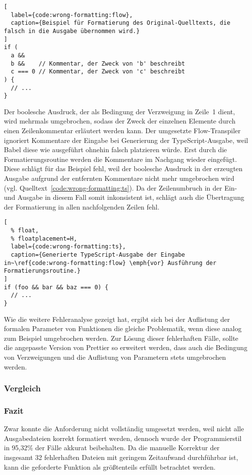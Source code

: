 \begin{lstlisting}[
  label={code:wrong-formatting:flow},
  caption={Beispiel für Formatierung des Original-Quelltexts, die falsch in die Ausgabe übernommen wird.}
]
if (
  a &&
  b &&    // Kommentar, der Zweck von 'b' beschreibt
  c === 0 // Kommentar, der Zweck von 'c' beschreibt
) {
  // ...
}
\end{lstlisting}

Der boolesche Ausdruck, der als Bedingung der Verzweigung in Zeile~1 dient, wird mehrmals umgebrochen, sodass der Zweck der einzelnen Elemente durch einen Zeilenkommentar erläutert werden kann. Der umgesetzte Flow-Transpiler ignoriert Kommentare der Eingabe bei Generierung der TypeScript-Ausgabe, weil Babel diese wie ausgeführt ohnehin falsch platzieren würde. Erst durch die Formatierungsroutine werden die Kommentare im Nachgang wieder eingefügt. Diese schlägt für das Beispiel fehl, weil der boolesche Ausdruck in der erzeugten Ausgabe aufgrund der entfernten Kommentare nicht mehr umgebrochen wird (vgl. Quelltext~\ref{code:wrong-formatting:ts}). Da der Zeilenumbruch in der Ein- und Ausgabe in diesem Fall somit inkonsistent ist, schlägt auch die Übertragung der Formatierung in allen nachfolgenden Zeilen fehl.

\begin{lstlisting}[
  % float,
  % floatplacement=H,
  label={code:wrong-formatting:ts},
  caption={Generierte TypeScript-Ausgabe der Eingabe in~\ref{code:wrong-formatting:flow} \emph{vor} Ausführung der Formatierungsroutine.}
]
if (foo && bar && baz === 0) {
  // ...
}
\end{lstlisting}

Wie die weitere Fehleranalyse gezeigt hat, ergibt sich bei der Auflistung der formalen Parameter von Funktionen die gleiche Problematik, wenn diese analog zum Beispiel umgebrochen werden. Zur Lösung dieser fehlerhaften Fälle, sollte die angepasste Version von Prettier so erweitert werden, dass auch die Bedingung von Verzweigungen und die Auflistung von Parametern stets umgebrochen werden.

\subsubsection{Vergleich}



\subsubsection{Fazit}

Zwar konnte die Anforderung nicht vollständig umgesetzt werden, weil nicht alle Ausgabedateien korrekt formatiert werden, dennoch wurde der Programmierstil in 95,32\% der Fälle akkurat beibehalten. Da die manuelle Korrektur der insgesamt 32 fehlerhaften Dateien mit geringem Zeitaufwand durchführbar ist, kann die geforderte Funktion als größtenteils erfüllt betrachtet werden.
